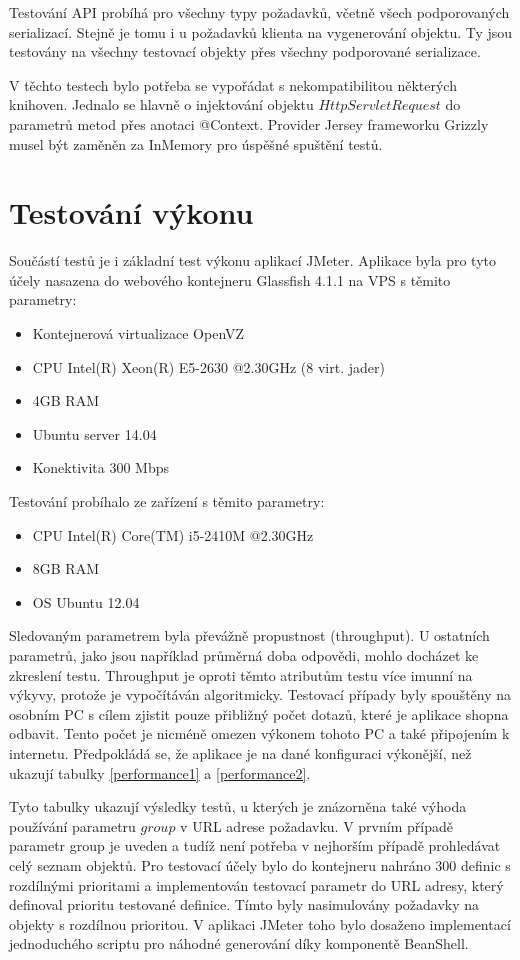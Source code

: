 \documentclass[thesis=B,czech]{FITthesis}[2012/06/26]
\begin{document}
  Testování API probíhá pro všechny typy požadavků, včetně všech podporovaných serializací. Stejně je tomu i u požadavků klienta na vygenerování objektu.
  Ty jsou testovány na všechny testovací objekty přes všechny podporované serializace.
  
  V těchto testech bylo potřeba se vypořádat s nekompatibilitou některých knihoven. Jednalo se hlavně o injektování objektu $HttpServletRequest$ do parametrů
  metod přes anotaci @Context. Provider Jersey frameworku Grizzly musel být zaměněn za InMemory pro úspěšné spuštění testů.
  
  \section{Testování výkonu}
  Součástí testů je i základní test výkonu aplikací JMeter. Aplikace byla pro tyto účely nasazena do webového kontejneru Glassfish 4.1.1 na VPS s těmito parametry:
  \begin{itemize}
   \item Kontejnerová virtualizace OpenVZ
   \item CPU Intel(R) Xeon(R) E5-2630 @2.30GHz (8 virt. jader)
   \item 4GB RAM
   \item Ubuntu server 14.04
   \item Konektivita 300 Mbps
  \end{itemize}
  
  Testování probíhalo ze zařízení s těmito parametry:
  \begin{itemize}
   \item CPU Intel(R) Core(TM) i5-2410M @2.30GHz
   \item 8GB RAM
   \item OS Ubuntu 12.04
  \end{itemize}
  
  Sledovaným parametrem byla převážně propustnost (throughput). U ostatních parametrů, jako jsou například průměrná doba odpovědi, mohlo docházet ke zkreslení
  testu. Throughput je oproti těmto atributům testu více imunní na výkyvy, protože je vypočítáván algoritmicky.
  Testovací případy byly spouštěny na osobním PC s cílem zjistit pouze přibližný počet dotazů, které je aplikace shopna odbavit. Tento počet je nicméně
  omezen výkonem tohoto PC a také připojením k internetu. Předpokládá se, že aplikace je na dané konfiguraci výkonější, než ukazují tabulky \ref{performance1} a \ref{performance2}.
  
  Tyto tabulky ukazují výsledky testů, u kterých je znázorněna také výhoda používání parametru $group$ v URL adrese požadavku. V prvním případě parametr group je uveden 
  a tudíž není potřeba v nejhorším případě prohledávat celý seznam objektů. Pro testovací účely bylo do kontejneru nahráno 300 definic s rozdílnými prioritami a implementován testovací parametr
  do URL adresy, který definoval prioritu testované definice. Tímto byly nasimulovány požadavky na objekty s rozdílnou prioritou. V aplikaci JMeter toho bylo
  dosaženo implementací jednoduchého scriptu pro náhodné generování díky komponentě BeanShell.
  
\end{document}
